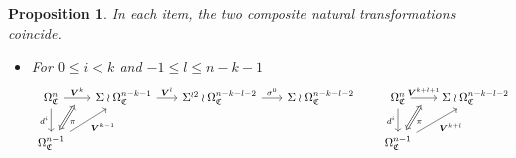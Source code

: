 \documentclass[a4paper,10pt
,draft
]{article}%
\numberwithin{equation}{section}
\numberwithin{figure}{section}
\newtheorem{proposition}[equation]{Proposition}%
\theoremstyle{definition} %
\newcommand{\1}{\ensuremath{\mathbbm 1}}%
\begin{document}
\begin{proposition}\label{CATDIAG2 PROP}
In each item, the two composite natural transformations coincide.
\begin{itemize}
\item[(IT1)]
For $0 \leq i < k $ and $-1 \leq l \leq n-k-1$
\begin{equation}
\begin{tikzcd}[row sep = 20pt, column sep = 18pt]
	|[alias=V]|
	\Omega_{\mathfrak{C}}^{n} \ar{r}{\boldsymbol{V}^{k}}[swap,name=UU]{} \arrow{d}[swap]{d^i}&
	\Sigma \wr \Omega_{\mathfrak{C}}^{n-k-1} \ar{r}{\boldsymbol{V}^l} &
	\Sigma^{\wr 2} \wr \Omega^{n-k-l-2}_{\mathfrak{C}} \ar{r}{\sigma^0} &
	\Sigma \wr \Omega^{n-k-l-2}_{\mathfrak{C}}
&
	\Omega^{n}_{\mathfrak{C}} \ar{r}{\boldsymbol{V}^{k+l+1}}[swap,name=UUU]{} \arrow{d}[swap]{d^i}&
	\Sigma \wr \Omega^{n-k-l-2}_{\mathfrak{C}} &
\\
	|[alias=VV]|
	\Omega^{n-1}_{\mathfrak{C}} \arrow{ur}[swap]{\boldsymbol{V}^{k-1}} & & &
&
	|[alias=VVV]|
	\Omega^{n-1}_{\mathfrak{C}} \arrow{ur}[swap]{\boldsymbol{V}^{k+l}} &
\arrow[Leftrightarrow, from=VV, to=UU,shorten >=0.05cm,shorten <=0.05cm
,swap,"\pi"
]
\arrow[Leftrightarrow, from=VVV, to=UUU,shorten >=0.05cm,shorten <=0.05cm
,swap,"\pi"
]
\end{tikzcd}
\end{equation}



\end{itemize}
\end{proposition}
\end{document}
